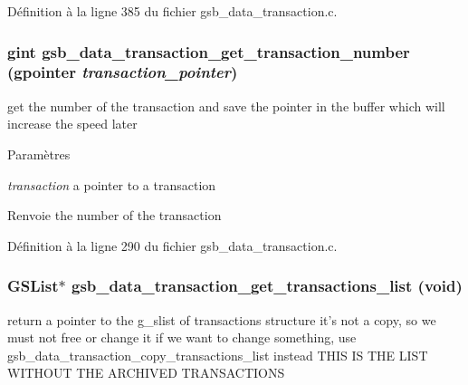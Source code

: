 Définition à la ligne 385 du fichier gsb\_\-data\_\-transaction.c.

\subsubsection[{gsb\_\-data\_\-transaction\_\-get\_\-transaction\_\-number}]{\setlength{\rightskip}{0pt plus 5cm}gint gsb\_\-data\_\-transaction\_\-get\_\-transaction\_\-number (gpointer {\em transaction\_\-pointer})}\label{gsb__data__transaction_8h_a99bf548513083f4a71fe019faeccbe0a}
get the number of the transaction and save the pointer in the buffer which will increase the speed later 
\begin{DoxyParams}{Paramètres}
\item[{\em transaction}]a pointer to a transaction \end{DoxyParams}
\begin{DoxyReturn}{Renvoie}
the number of the transaction 
\end{DoxyReturn}


Définition à la ligne 290 du fichier gsb\_\-data\_\-transaction.c.

\subsubsection[{gsb\_\-data\_\-transaction\_\-get\_\-transactions\_\-list}]{\setlength{\rightskip}{0pt plus 5cm}GSList$\ast$ gsb\_\-data\_\-transaction\_\-get\_\-transactions\_\-list (void)}\label{gsb__data__transaction_8h_af781a71a62eece020188ef62847f2887}
return a pointer to the g\_\-slist of transactions structure it's not a copy, so we must not free or change it if we want to change something, use gsb\_\-data\_\-transaction\_\-copy\_\-transactions\_\-list instead THIS IS THE LIST WITHOUT THE ARCHIVED TRANSACTIONS


